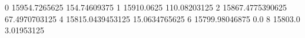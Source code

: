 0 15954.7265625 154.74609375
1 15910.0625 110.08203125
2 15867.4775390625 67.4970703125
4 15815.0439453125 15.0634765625
6 15799.98046875 0.0
8 15803.0 3.01953125
